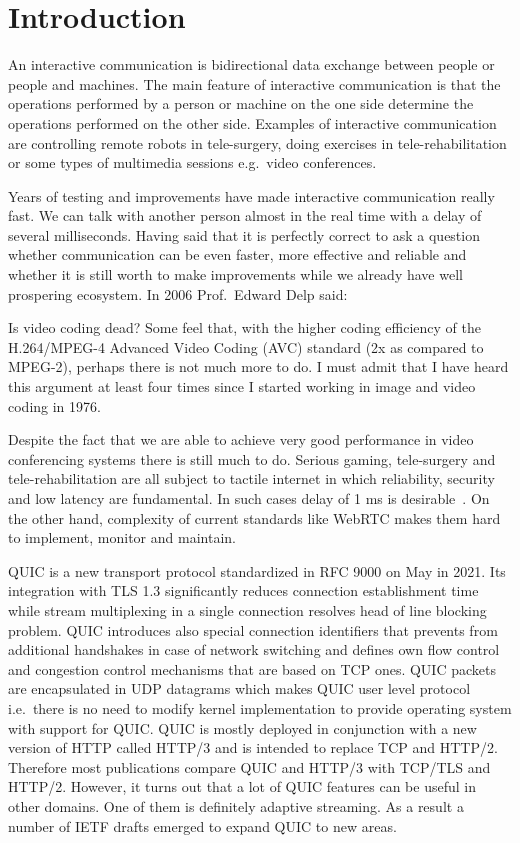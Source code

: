 \section{Introduction}
\label{sec:introduction}

An interactive communication is bidirectional data exchange between people or people and machines.
The main feature of interactive communication is that the operations performed by a person or machine on the one side determine the operations performed on the other side.
Examples of interactive communication are controlling remote robots in tele-surgery, doing exercises in tele-rehabilitation or some types of multimedia sessions e.g.\ video conferences.

Years of testing and improvements have made interactive communication really fast.
We can talk with another person almost in the real time with a delay of several milliseconds.
Having said that it is perfectly correct to ask a question whether communication can be even faster, more effective and reliable and whether it is still worth to make improvements while we already have well prospering ecosystem.
In 2006 Prof.\ Edward Delp said:
\begin{displayquote}
    Is video coding dead?
    Some feel that, with the higher coding efficiency of the H.264/MPEG-4 Advanced Video Coding (AVC) standard (2x as compared to MPEG-2), perhaps there is not much more to do.
    I must admit that I have heard this  argument at least four times since I started working in image and video coding in 1976.\cite{4015574}
\end{displayquote}
Despite the fact that we are able to achieve very good performance in video conferencing systems there is still much to do.
Serious gaming, tele-surgery and tele-rehabilitation are all subject to tactile internet in which reliability, security and low latency are fundamental.
In such cases delay of 1 ms is desirable~\cite{the-tactile-internet}.
On the other hand, complexity of current standards like WebRTC makes them hard to implement, monitor and maintain.


QUIC is a new transport protocol standardized in RFC 9000 on May in 2021.
Its integration with TLS 1.3 significantly reduces connection establishment time while stream multiplexing in a single connection resolves head of line blocking problem.
QUIC introduces also special connection identifiers that prevents from additional handshakes in case of network switching and defines own flow control and congestion control mechanisms that are based on TCP ones.
QUIC packets are encapsulated in UDP datagrams which makes QUIC user level protocol i.e.\ there is no need to modify kernel implementation to provide operating system with support for QUIC\@.
QUIC is mostly deployed in conjunction with a new version of HTTP called HTTP/3 and is intended to replace TCP and HTTP/2.
Therefore most publications compare QUIC and HTTP/3 with TCP/TLS and HTTP/2.
However, it turns out that a lot of QUIC features can be useful in other domains.
One of them is definitely adaptive streaming.
As a result a number of IETF drafts emerged to expand QUIC to new areas.

